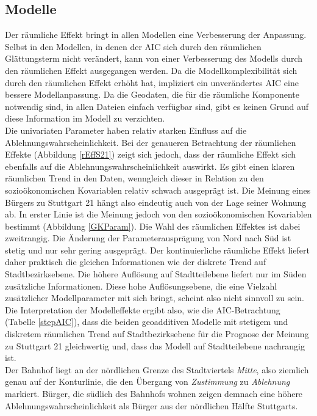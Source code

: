 \documentclass{Vorlage}
\begin{document}
\subsection{Modelle}
Der räumliche Effekt bringt in allen Modellen eine Verbesserung der Anpassung. Selbst in den Modellen, in denen der AIC sich durch den räumlichen Glättungsterm nicht verändert, kann von einer Verbesserung des Modells durch den räumlichen Effekt ausgegangen werden. Da die Modellkomplexibilität sich durch den räumlichen Effekt erhöht hat, impliziert ein unverändertes AIC eine bessere Modellanpassung. Da die Geodaten, die für die räumliche Komponente notwendig sind, in allen Dateien einfach verfügbar sind, gibt es keinen Grund auf diese Information im Modell zu verzichten.\\
Die univariaten Parameter haben relativ starken Einfluss auf die Ablehnungswahrscheinlichkeit. Bei der genaueren Betrachtung der räumlichen Effekte (Abbildung \ref{rEffS21}) zeigt sich jedoch, dass der räumliche Effekt sich ebenfalls auf die Ablehnungswahrscheinlichkeit auswirkt. Es gibt einen klaren räumlichen Trend in den Daten, wenngleich dieser in Relation zu den sozioökonomischen Kovariablen relativ schwach ausgeprägt ist. Die Meinung eines Bürgers zu Stuttgart 21 hängt also eindeutig auch von der Lage seiner Wohnung ab. In erster Linie ist die Meinung jedoch von den sozioökonomischen Kovariablen bestimmt (Abbildung \ref{GKParam}). Die Wahl des räumlichen Effektes ist dabei zweitrangig. Die Änderung der Parameterausprägung von Nord nach Süd ist stetig und nur sehr gering ausgeprägt. Der kontinuierliche räumliche Effekt liefert daher praktisch die gleichen Informationen wie der diskrete Trend auf Stadtbezirksebene. Die höhere Auflösung auf Stadtteilebene liefert nur im Süden zusätzliche Informationen. Diese hohe Auflösungsebene, die eine Vielzahl zusätzlicher Modellparameter mit sich bringt, scheint also nicht sinnvoll zu sein. Die Interpretation der Modelleffekte ergibt also, wie die AIC-Betrachtung (Tabelle \ref{stepAIC}), dass die beiden geoadditiven Modelle mit stetigem und diskretem räumlichen Trend auf Stadtbezirksebene für die Prognose der Meinung zu Stuttgart 21 gleichwertig und, dass das Modell auf Stadtteilebene nachrangig ist.\\
Der Bahnhof liegt an der nördlichen Grenze des Stadtviertels \textit{Mitte}, also ziemlich genau auf der Konturlinie, die den Übergang von \textit{Zustimmung} zu \textit{Ablehnung} markiert. Bürger, die südlich des Bahnhofs wohnen zeigen demnach eine höhere Ablehnungswahrscheinlichkeit als Bürger aus der nördlichen Hälfte Stuttgarts.\\
\end{document}
